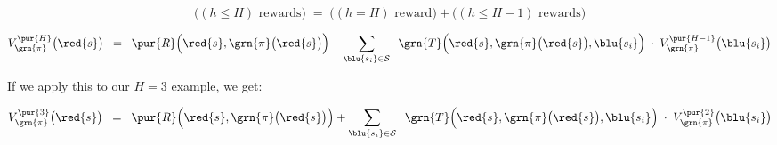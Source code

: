         \begin{equation}
            \Big( (h \leq H) \text{ rewards}\Big) \;=\;
            \Big( (h = H) \text{ reward}\Big) +
            \Big( (h \leq H-1) \text{ rewards}\Big)
        \end{equation}

        \begin{equation}
            V_{\grn{\pi}}^{\pur{H}}\big(\red{s} \big) \;\;=\;\; \pur{R} \Big( \red{s},\grn{\pi}\big(\red{s}\big) \Big) +
            \sum_{\blu{s_i} \in \mathcal{S}}  
                    \;\;
                    \grn{T} \Big(          \red{s},\grn{\pi}\big(\red{s}\big),\blu{s_i} \Big)
                    \;\cdot\; 
                    V_{\grn{\pi}}^{\pur{H-1}}\big(\blu{s_i} \big)
        \end{equation}

        If we apply this to our $H=3$ example, we get:

        \begin{equation}
            V_{\grn{\pi}}^{\pur{3}}\big(\red{s} \big) \;\;=\;\; \pur{R} \Big( \red{s},\grn{\pi}\big(\red{s}\big) \Big) +
            \sum_{\blu{s_i} \in \mathcal{S}}  
                    \;\;
                    \grn{T} \Big(          \red{s},\grn{\pi}\big(\red{s}\big),\blu{s_i} \Big)
                    \;\cdot\; 
                    V_{\grn{\pi}}^{\pur{2}}\big(\blu{s_i} \big)
        \end{equation}

